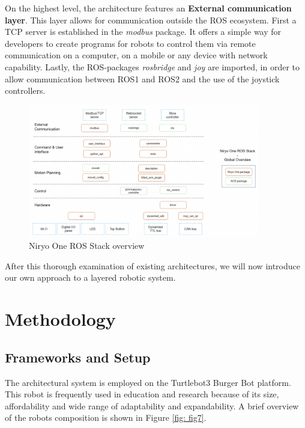 \documentclass[%
paper=A4,               %
twoside=true,           %
openright,              %
11pt,                   %
bibliography=totoc,     %
titlepage=on,           %
DIV=12,                 %
BCOR=1.5cm,             %
parskip=half,            %
final
]{scrreprt}
\begin{document}
	On the highest level, the architecture features an \textbf{External communication layer}.  This layer allows for communication outside the ROS ecosystem. First a TCP server is established in the \textit{modbus} package. It offers a simple way for developers to create programs for robots to control them via remote communication on a computer, on a mobile or any device with network capability. Lastly, the ROS-packages \textit{rosbridge} and \textit{joy} are imported, in order to allow communication between ROS1 and ROS2 and the use of the joystick controllers. \autocite{roboticsGetStartedNiryo2024,roboticsNiryoOneROS2024}
	
	
	\begin{figure}[ht]
		\centering
		\includegraphics[width=0.9\textwidth]{Graphics/Niryo}
		\caption{Niryo One ROS Stack overview \autocite{roboticsNiryoOneROS2024}}
		\label{fig: fig6}
	\end{figure}
	
	After this thorough examination of existing architectures, we will now introduce our own approach to a layered robotic system. 
	
	
	\chapter{Methodology}
	\section{Frameworks and Setup}

	The architectural system is employed on the Turtlebot3 Burger Bot platform. This robot is frequently used in education and research because of its size, affordability and wide range of adaptability and expandability. A brief overview of the robots composition is shown in Figure \ref{fig: fig7}. 
		
\end{document}

